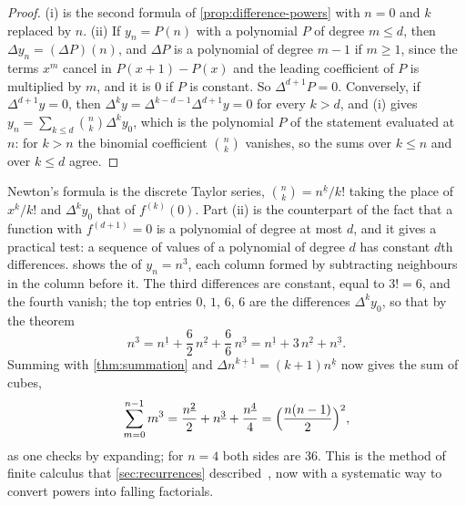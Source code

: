 \begin{proof}
(i) is the second formula of \cref{prop:difference-powers} with $n=0$ and $k$ replaced by $n$. (ii) If $y_n=P(n)$ with a polynomial $P$ of degree $m\le d$, then $\Delta y_n=(\Delta P)(n)$, and $\Delta P$ is a polynomial of degree $m-1$ if $m\ge1$, since the terms $x^m$ cancel in $P(x+1)-P(x)$ and the leading coefficient of $P$ is multiplied by $m$, and it is $0$ if $P$ is constant. So $\Delta^{d+1}P=0$. Conversely, if $\Delta^{d+1}y=0$, then $\Delta^ky=\Delta^{k-d-1}\Delta^{d+1}y=0$ for every $k>d$, and (i) gives $y_n=\sum_{k\le d}\binom nk\Delta^ky_0$, which is the polynomial $P$ of the statement evaluated at $n$: for $k>n$ the binomial coefficient $\binom nk$ vanishes, so the sums over $k\le n$ and over $k\le d$ agree.
\end{proof}

Newton's formula is the discrete Taylor series, $\binom nk=n^{\underline k}/k!$ taking the place of $x^k/k!$ and $\Delta^ky_0$ that of $f^{(k)}(0)$. Part (ii) is the counterpart of the fact that a function with $f^{(d+1)}=0$ is a polynomial of degree at most $d$, and it gives a practical test: a sequence of values of a polynomial of degree $d$ has constant $d$th differences.  shows the  of $y_n=n^3$, each column formed by subtracting neighbours in the column before it. The third differences are constant, equal to $3!=6$, and the fourth vanish; the top entries $0$, $1$, $6$, $6$ are the differences $\Delta^ky_0$, so that by the theorem
\[
n^3=n^{\underline1}+\frac62\,n^{\underline2}+\frac66\,n^{\underline3}=n^{\underline1}+3\,n^{\underline2}+n^{\underline3} .
\]
Summing with \cref{thm:summation} and $\Delta n^{\underline{k+1}}=(k+1)n^{\underline k}$ now gives the sum of cubes,
\[
\sum_{m=0}^{n-1}m^3=\frac{n^{\underline2}}2+n^{\underline3}+\frac{n^{\underline4}}4=\Bigl(\frac{n(n-1)}2\Bigr)^2 ,
\]
as one checks by expanding; for $n=4$ both sides are $36$. This is the method of finite calculus that \cref{sec:recurrences} described~\cite[Sect.~2.6]{graham1994concrete}, now with a systematic way to convert powers into falling factorials.


